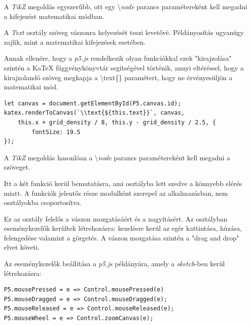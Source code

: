 A \textit{TikZ} megoldás egyszerűbb, ott egy \textbackslash \textit{node} parancs paramétereként kell megadni a kifejezést matematikai módban.


A \textit{Text} osztály szöveg vászonra helyezését teszi levetővé. Példányosítás ugyanúgy zajlik, mint a matematikai kifejezések esetében.

Annak ellenére, hogy a \textit{p5.js} rendelkezik olyan funkciókkal ezek "kirajzolása" szintén a KaTeX függvénykönyvtár segítségével történik, annyi eltéréssel, hogy a kirajzolandó szöveg megkapja a \textbackslash text\{\} paramétert, hogy ne érvényesüljön a matematikai mód.

\begin{lstlisting}[style=es6, morekeywords={document, P5, katex}]
let canvas = document.getElementById(P5.canvas.id);
katex.renderToCanvas(`\\text{${this.text}}`, canvas, 
    this.x + grid_density / 8, this.y - grid_density / 2.5, {
	    fontSize: 19.5
});
\end{lstlisting}

A \textit{TikZ} megoldás hasonlóan a \textbackslash \textit{node} parancs paramétereként kell megadni a szöveget.


Itt a két funkció kerül bemutatásra, ami osztályba lett szedve a könnyebb elérés miatt. A funkciók jelentős része modulként szerepel az alkalmazásban, nem osztályokba csoportosítva.


Ez az osztály felelős a vászon mozgatásáért és a nagyításért. Az osztályban eseménykezelők kerültek létrehozásra: kezelésre kerül az egér kattintása, húzása, felengedése valamint a görgetés. A vászon mozgatása szintén a "drag and drop" elvet követi.

Az eseménykezelők beállítása a \textit{p5.js} példányára, amely a \textit{sketch}-ben kerül létrehozásra:

\begin{lstlisting}[style=es6, morekeywords={P5, Control}]
P5.mousePressed = e => Control.mousePressed(e)
P5.mouseDragged = e => Control.mouseDragged(e);
P5.mouseReleased = e => Control.mouseReleased(e);
P5.mouseWheel = e => Control.zoomCanvas(e);
\end{lstlisting}


